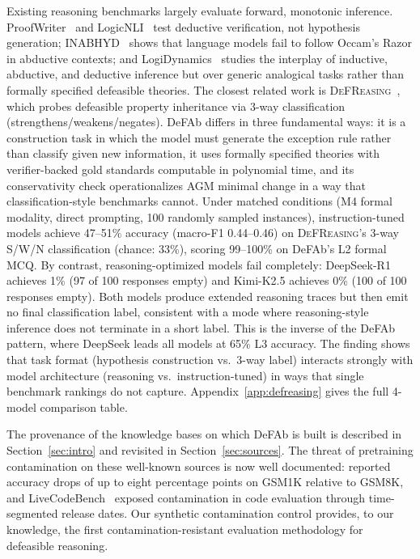 \documentclass{article}
\theoremstyle{definition}
\begin{document}
Existing reasoning benchmarks largely evaluate forward, monotonic inference. ProofWriter~\citep{tafjord2021proofwriter} and LogicNLI~\citep{tian2021diagnosing} test deductive verification, not hypothesis generation; INABHYD~\citep{inabhyd2025} shows that language models fail to follow Occam's Razor in abductive contexts; and LogiDynamics~\citep{zheng2025logidynamics} studies the interplay of inductive, abductive, and deductive inference but over generic analogical tasks rather than formally specified defeasible theories. The closest related work is \textsc{DeFReasing}~\citep{allaway2025defreasing}, which probes defeasible property inheritance via 3-way classification (strengthens/weakens/negates). DeFAb differs in three fundamental ways: it is a construction task in which the model must generate the exception rule rather than classify given new information, it uses formally specified theories with verifier-backed gold standards computable in polynomial time, and its conservativity check operationalizes AGM minimal change in a way that classification-style benchmarks cannot. Under matched conditions (M4 formal modality, direct prompting, 100 randomly sampled instances), instruction-tuned models achieve 47--51\% accuracy (macro-F1 0.44--0.46) on \textsc{DeFReasing}'s 3-way S/W/N classification (chance: 33\%), scoring 99--100\% on DeFAb's L2 formal MCQ. By contrast, reasoning-optimized models fail completely: DeepSeek-R1 achieves 1\% (97 of 100 responses empty) and Kimi-K2.5 achieves 0\% (100 of 100 responses empty). Both models produce extended reasoning traces but then emit no final classification label, consistent with a mode where reasoning-style inference does not terminate in a short label. This is the inverse of the DeFAb pattern, where DeepSeek leads all models at 65\% L3 accuracy. The finding shows that task format (hypothesis construction vs.\ 3-way label) interacts strongly with model architecture (reasoning vs.\ instruction-tuned) in ways that single benchmark rankings do not capture. Appendix~\ref{app:defreasing} gives the full 4-model comparison table.

The provenance of the knowledge bases on which DeFAb is built is described in Section~\ref{sec:intro} and revisited in Section~\ref{sec:sources}. The threat of pretraining contamination on these well-known sources is now well documented: \citet{zhang2024gsm1k} reported accuracy drops of up to eight percentage points on GSM1K relative to GSM8K, and LiveCodeBench~\citep{jain2025livecodebench} exposed contamination in code evaluation through time-segmented release dates. Our synthetic contamination control provides, to our knowledge, the first contamination-resistant evaluation methodology for defeasible reasoning.
\end{document}
